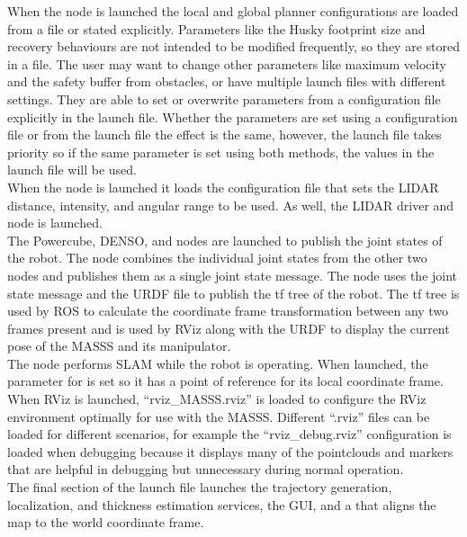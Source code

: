When the  node is launched the local and global planner configurations are loaded from a file or stated explicitly. Parameters like the Husky footprint size and recovery behaviours are not intended to be modified frequently, so they are stored in a file. The user may want to change other parameters like maximum velocity and the safety buffer from obstacles, or have multiple launch files with different settings. They are able to set or overwrite parameters from a configuration file explicitly in the launch file. Whether the parameters are set using a configuration file or from the launch file the effect is the same, however, the launch file takes priority so if the same parameter is set using both methods, the values in the launch file will be used.\\

When the  node is launched it loads the configuration file that sets the LIDAR distance, intensity, and angular range to be used. As well, the LIDAR driver and  node is launched.\\

The Powercube, DENSO, and  nodes are launched to publish the joint states of the robot. The  node combines the individual joint states from the other two nodes and publishes them as a single joint state message. The node  uses the joint state message and the URDF file to publish the tf tree of the robot. The tf tree is used by ROS to calculate the coordinate frame transformation between any two frames present and is used by RViz along with the URDF to display the current pose of the MASSS and its manipulator.\\

The node  performs SLAM while the robot is operating. When launched, the parameter for  is set so it has a point of reference for its local coordinate frame.\\

When RViz is launched, ``rviz\_MASSS.rviz'' is loaded to configure the RViz environment optimally for use with the MASSS. Different ``.rviz'' files can be loaded for different scenarios, for example the ``rviz\_debug.rviz'' configuration is loaded when debugging because it displays many of the pointclouds and markers that are helpful in debugging but unnecessary during normal operation.\\

The final section of the launch file launches the trajectory generation, localization, and thickness estimation services, the  GUI, and a  that aligns the map to the world coordinate frame.\\

